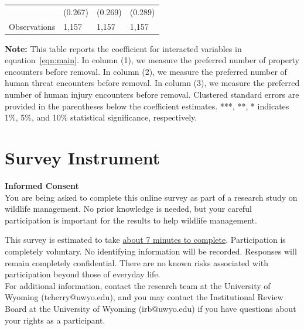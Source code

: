 \documentclass[english,12pt]{article}
\begin{document}
\begin{table}[H]
\begin{tabular}{@{}llll@{}}
            &     (0.267)   &     (0.269)   &     (0.289)   \\
        Observations & 1,157    &  1,157       & 1,157        \\\bottomrule
    \end{tabular}
    \begin{minipage}{.9\textwidth}
        \vspace{1em}
    \footnotesize{{\bf{Note:}} This table reports the coefficient for interacted variables in equation~\ref{eqn:main}. In column (1), we measure the preferred number of property encounters before removal. In column (2), we measure the preferred number of human threat encounters before removal. In column (3), we measure the preferred number of human injury encounters before removal. Clustered standard errors are provided in the parentheses below the coefficient estimates. ***, **, * indicates 1\%, 5\%, and 10\% statistical significance, respectively.}
    \label{tab: des_int}
    \end{minipage}
\end{table}



\section{Survey Instrument}
\label{sec:survey}
\newlength{\oldparindent}%
\setlength{\oldparindent}{\parindent}%
\setlength{\parindent}{0em}%

{\large\textbf{Informed Consent}}\\
You are being asked to complete this online survey as part of a research study on wildlife management. No prior knowledge is needed, but your careful participation is important for the results to help wildlife management.

This survey is estimated to take \underline{about 7 minutes to complete}. Participation is completely voluntary. No identifying information will be recorded. Responses will remain completely confidential. There are no known risks associated with participation beyond those of everyday life.\\

For additional information, contact the research team at the University of Wyoming (tcherry@uwyo.edu), and you may contact the Institutional Review Board at the University of Wyoming (irb@uwyo.edu) if you have questions about your rights as a participant.\\
\end{document}
